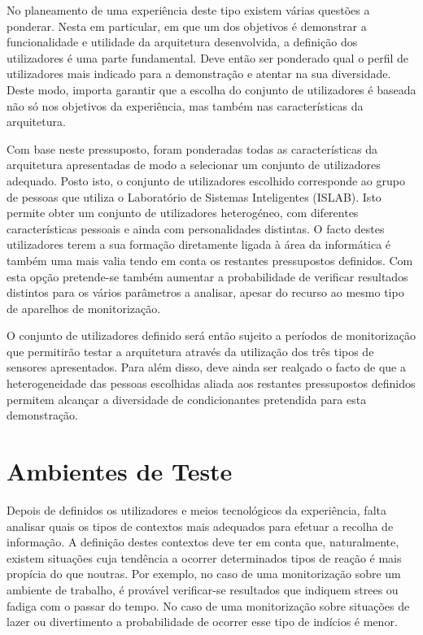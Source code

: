 No planeamento de uma experiência deste tipo existem várias questões a ponderar. Nesta em particular, em que um dos objetivos é demonstrar a funcionalidade e utilidade da arquitetura desenvolvida, a definição dos utilizadores é uma parte fundamental. Deve então ser ponderado qual o perfil de utilizadores mais indicado para a demonstração e atentar na sua diversidade. Deste modo, importa garantir que a escolha do conjunto de utilizadores é baseada não só nos objetivos da experiência, mas também nas características da arquitetura.

Com base neste pressuposto, foram ponderadas todas as características da arquitetura apresentadas de modo a selecionar um conjunto de utilizadores adequado. Posto isto, o conjunto de utilizadores escolhido corresponde ao grupo de pessoas que utiliza o Laboratório de Sistemas Inteligentes (ISLAB). Isto permite obter um conjunto de utilizadores heterogéneo, com diferentes características pessoais e ainda com personalidades distintas. O facto destes utilizadores terem a sua formação diretamente ligada à área da informática é também uma mais valia tendo em conta os restantes pressupostos definidos. Com esta opção pretende-se também aumentar a probabilidade de verificar resultados distintos para os vários parâmetros a analisar, apesar do recurso ao mesmo tipo de aparelhos de monitorização.

O conjunto de utilizadores definido será então sujeito a períodos de monitorização que permitirão testar a arquitetura através da utilização dos três tipos de sensores apresentados.  Para além disso, deve ainda ser realçado o facto de que a heterogeneidade das pessoas escolhidas aliada aos restantes pressupostos definidos permitem alcançar a diversidade de condicionantes pretendida para esta demonstração.


\section{Ambientes de Teste}

Depois de definidos os utilizadores e meios tecnológicos da experiência, falta analisar quais os tipos de contextos mais adequados para efetuar a recolha de informação. A definição destes contextos deve ter em conta que, naturalmente, existem situações cuja tendência a ocorrer determinados tipos de reação é mais propícia do que noutras. Por exemplo, no caso de uma monitorização sobre um ambiente de trabalho, é provável verificar-se resultados que indiquem strees ou fadiga com o passar do tempo. No caso de uma monitorização sobre situações de lazer ou divertimento a probabilidade de ocorrer esse tipo de indícios é menor.

